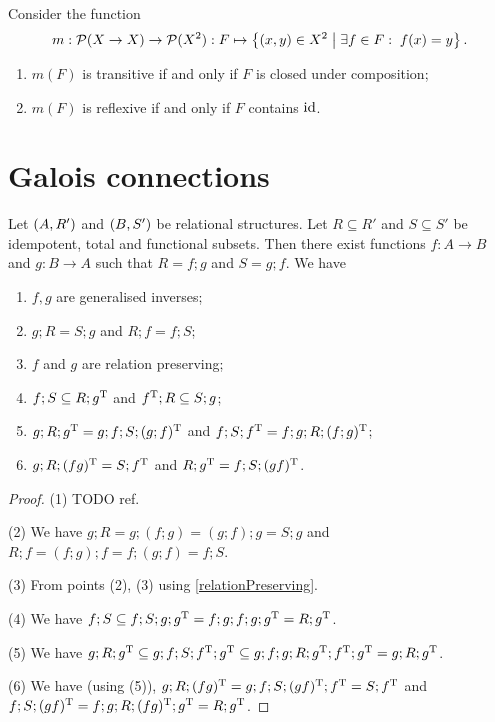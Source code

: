 \begin{proposition}
Consider the function
\[ m: \operatorname{\mathcal{P}}(X\to X) \to \operatorname{\mathcal{P}}(X^2): F \mapsto \left\{ (x,y)\in X^2 \;\middle|\; \exists f\in F: \; f(x) = y \right\}. \]
\begin{enumerate}
\item $m(F)$ is transitive \textup{if and only if} $F$ is closed under composition;
\item $m(F)$ is reflexive \textup{if and only if} $F$ contains $\operatorname{id}$.
\end{enumerate}
\end{proposition}

\section{Galois connections}
\begin{proposition}
Let $\left( A,R' \right)$ and $\left( B, S' \right)$ be relational structures. Let $R\subseteq R'$ and $S\subseteq S'$ be idempotent, total and functional subsets. Then there exist functions $f: A\to B$ and $g: B\to A$ such that $R = f;g$ and $S = g;f$. We have
\begin{enumerate}
\item $f,g$ are generalised inverses;
\item $g;R = S;g$ and $R;f = f;S$;
\item $f$ and $g$ are relation preserving;
\item $f;S \subseteq R;g^{\mathrm{T}}$ and $f^{\mathrm{T}} ;R \subseteq S;g$;
\item $g;R;g^{\mathrm{T}} = g;f;S;(g;f)^{\mathrm{T}}$ and $f;S;f^{\mathrm{T}} = f;g;R;(f;g)^{\mathrm{T}}$;
\item $g;R;(fg)^{\mathrm{T}} = S;f^{\mathrm{T}}$ and $R;g^{\mathrm{T}} = f;S;(gf)^{\mathrm{T}}$.
\end{enumerate}
\end{proposition}
\begin{proof}
(1) TODO ref.

(2) We have $g;R = g;(f;g) = (g;f);g = S;g$ and  $R;f = (f;g);f = f;(g;f) = f;S$.

(3) From points (2), (3) using \ref{relationPreserving}.

(4) We have $f;S \subseteq f;S;g;g^{\mathrm{T}} = f;g;f;g;g^{\mathrm{T}} = R;g^{\mathrm{T}}$.

(5) We have $g;R;g^{\mathrm{T}} \subseteq g;f;S;f^{\mathrm{T}};g^{\mathrm{T}} \subseteq g;f;g;R;g^{\mathrm{T}}; f^{\mathrm{T}}; g^{\mathrm{T}} = g;R;g^{\mathrm{T}}$.

(6) We have (using (5)), $g;R;(fg)^{\mathrm{T}} = g;f;S;(gf)^{\mathrm{T}};f^{\mathrm{T}} = S;f^{\mathrm{T}}$ and $f;S;(gf)^{\mathrm{T}} = f;g;R;(fg)^{\mathrm{T}}; g^{\mathrm{T}} = R;g^{\mathrm{T}}$.
\end{proof}

